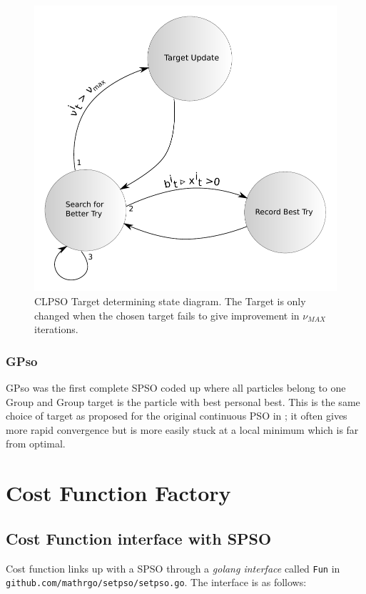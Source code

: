 \documentclass[a4paper,oneside,english]{book}
\numberwithin{equation}{section}
\numberwithin{figure}{section}
\newcommand{\codesorc}[1]{\texttt{github.com/mathrgo/setpso/#1}}
\begin{document}
\begin{figure}
	\centering
	\includegraphics[width=0.7\linewidth]{CLPSO.pdf}
	\caption[CLPSO State Diagram for Determining Target]{CLPSO Target determining state diagram. The Target is only changed when the chosen target fails to give improvement in $\nu_{MAX}$ iterations.}
	\label{fig:clpso}
\end{figure}

\subsection{GPso}
GPso was the first complete SPSO coded up where all particles belong to one Group and Group target is the particle with best personal best. This  is the same choice of target as proposed for the original continuous  PSO in \cite{KE-pso}; it often gives more rapid convergence but is more easily stuck at a local minimum which is far from optimal. 

\chapter{Cost Function Factory}
\section{Cost Function interface with SPSO \label{sec:cost_fun_Interface_SPSO}} 
Cost function links up with a SPSO through a \emph{golang interface }called \texttt{Fun}  in \codesorc{setpso.go}. The interface is as follows: 
\end{document}
